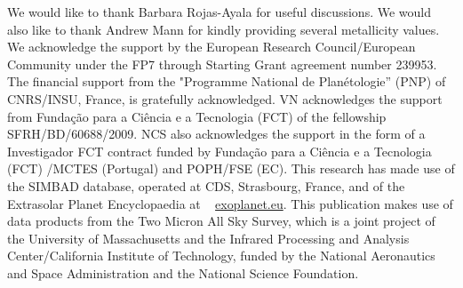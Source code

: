 \documentclass{aa}
\begin{document}





\begin{acknowledgements}
We would like to thank Barbara Rojas-Ayala for useful discussions. We would also like to thank Andrew Mann for kindly providing several metallicity values. We acknowledge the support by the European Research Council/European Community under the FP7 through Starting Grant agreement number 239953. The financial support from the "Programme National de Plan\'etologie'' (PNP) of CNRS/INSU, France, is gratefully acknowledged. VN acknowledges the support from Funda\c{c}\~ao para a Ci\^encia e a Tecnologia (FCT) of the fellowship SFRH/BD/60688/2009. NCS also acknowledges the support in the form of a Investigador FCT contract funded by Funda\c{c}\~ao para a Ci\^encia e a Tecnologia (FCT) /MCTES (Portugal) and POPH/FSE (EC). This research has made use of the SIMBAD database, operated at CDS, Strasbourg, France, and of the Extrasolar Planet Encyclopaedia at ~ \url{exoplanet.eu}. This publication makes use of data products from the Two Micron All Sky Survey, which is a joint project of the University of Massachusetts and the Infrared Processing and Analysis Center/California Institute of Technology, funded by the National Aeronautics and Space Administration and the National Science Foundation.

\end{acknowledgements}
\end{document}
